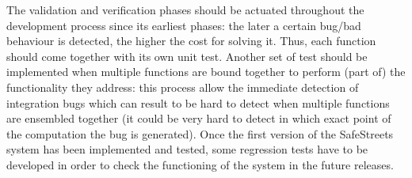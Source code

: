 The validation and verification phases should be actuated throughout the development process since its earliest phases: the later a certain bug/bad behaviour is detected, the higher the cost for solving it. Thus, each function should come together with its own unit test.\newline
Another set of test should be implemented when multiple functions are bound together to perform (part of) the functionality they address: this process allow the immediate detection of integration bugs which can result to be hard to detect when multiple functions are ensembled together (it could be very hard to detect in which exact point of the computation the bug is generated).
Once the first version of the SafeStreets system has been implemented and tested, some regression tests have to be developed in order to check the functioning of the system in the future releases.
